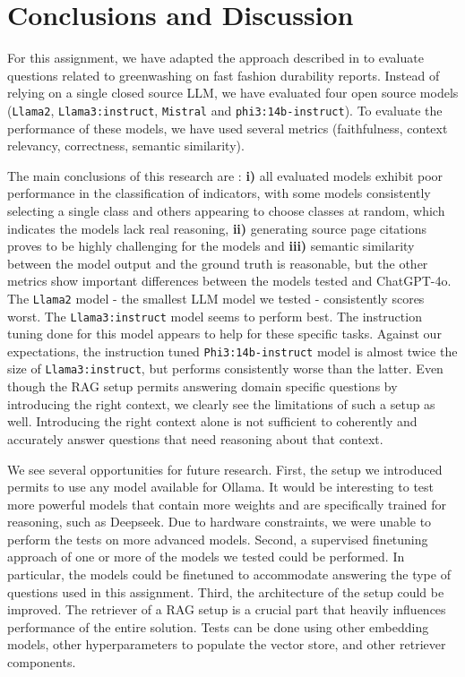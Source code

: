 \documentclass[]{article}
\begin{document}
\section{Conclusions and Discussion} \label{sec:conclusions}

For this assignment, we have adapted the approach described in \cite{durability} to evaluate questions related to greenwashing on fast fashion durability reports.
Instead of relying on a single closed source LLM, we have evaluated four open source models (\texttt{Llama2}, \texttt{Llama3:instruct}, \texttt{Mistral} and \texttt{phi3:14b-instruct}).
To evaluate the performance of these models, we have used several metrics (faithfulness, context relevancy, correctness, semantic similarity).

The main conclusions of this research are : \textbf{i)} all evaluated models exhibit poor performance in the classification of indicators, with some models consistently selecting a single class and others appearing to choose classes at random, which indicates the models lack real reasoning, \textbf{ii)} generating source page citations proves to be highly challenging for the models and \textbf{iii)} semantic similarity between the model output and the ground truth is reasonable, but the other metrics show important differences between the models tested and ChatGPT-4o.
The \texttt{Llama2} model - the smallest LLM model we tested -  consistently scores worst.
The \texttt{Llama3:instruct} model seems to perform best.
The instruction tuning done for this model appears to help for these specific tasks.
Against our expectations, the instruction tuned \texttt{Phi3:14b-instruct} model is almost twice the size of \texttt{Llama3:instruct}, but performs consistently worse than the latter.
Even though the RAG setup permits answering domain specific questions by introducing the right context, we clearly see the limitations of such a setup as well.
Introducing the right context alone is not sufficient to coherently and accurately answer questions that need reasoning about that context.

We see several opportunities for future research.
First, the setup we introduced permits to use any model available for Ollama.
It would be interesting to test more powerful models that contain more weights and are specifically trained for reasoning, such as Deepseek.
Due to hardware constraints, we were unable to perform the tests on more advanced models.
Second, a supervised finetuning approach of one or more of the models we tested could be performed.
In particular, the models could be finetuned to accommodate answering the type of questions used in this assignment.
Third, the architecture of the setup could be improved.
The retriever of a RAG setup is a crucial part that heavily influences performance of the entire solution.
Tests can be done using other embedding models, other hyperparameters to populate the vector store, and other retriever components.
\end{document}
